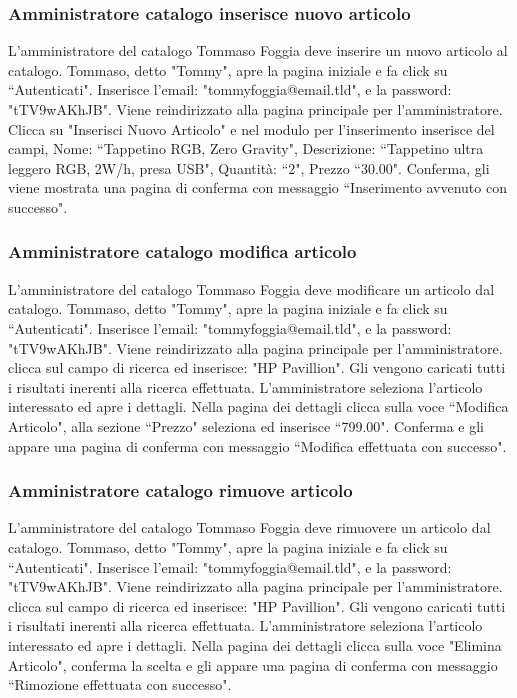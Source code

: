\documentclass[12pt]{article}
\begin{document}
\subsubsection{Amministratore catalogo inserisce nuovo articolo}
L'amministratore del catalogo Tommaso Foggia deve inserire un nuovo articolo al catalogo.
Tommaso, detto "Tommy", apre la pagina iniziale e fa click su ``Autenticati".
Inserisce l'email: "tommyfoggia@email.tld", e la password: "tTV9wAKhJB".
Viene reindirizzato alla pagina principale per l'amministratore.
Clicca su "Inserisci Nuovo Articolo" e nel modulo per l'inserimento inserisce del campi, Nome: ``Tappetino RGB, Zero Gravity", Descrizione: ``Tappetino ultra leggero RGB, 2W/h, presa USB",
Quantità: ``2", Prezzo ``30.00".
Conferma, gli viene mostrata una pagina di conferma con messaggio ``Inserimento avvenuto con successo".

\newpage

\subsubsection{Amministratore catalogo modifica articolo}
L'amministratore del catalogo Tommaso Foggia deve modificare un articolo dal catalogo.
Tommaso, detto "Tommy", apre la pagina iniziale e fa click su ``Autenticati".
Inserisce l'email: "tommyfoggia@email.tld", e la password: "tTV9wAKhJB".
Viene reindirizzato alla pagina principale per l'amministratore.
clicca sul campo di ricerca ed inserisce: "HP Pavillion".
Gli vengono caricati tutti i risultati inerenti alla ricerca effettuata.
L'amministratore seleziona l'articolo interessato ed apre i dettagli.
Nella pagina dei dettagli clicca sulla voce ``Modifica Articolo",
alla sezione ``Prezzo" seleziona ed inserisce ``799.00".
Conferma e gli appare una pagina di conferma con messaggio ``Modifica effettuata con successo".

\subsubsection{Amministratore catalogo rimuove articolo}
L'amministratore del catalogo Tommaso Foggia deve rimuovere un articolo dal catalogo.
Tommaso, detto "Tommy", apre la pagina iniziale e fa click su ``Autenticati".
Inserisce l'email: "tommyfoggia@email.tld", e la password: "tTV9wAKhJB".
Viene reindirizzato alla pagina principale per l'amministratore.
clicca sul campo di ricerca ed inserisce: "HP Pavillion".
Gli vengono caricati tutti i risultati inerenti alla ricerca effettuata.
L'amministratore seleziona l'articolo interessato ed apre i dettagli.
Nella pagina dei dettagli clicca sulla voce "Elimina Articolo",
conferma la scelta e gli appare una pagina di conferma con messaggio ``Rimozione effettuata con successo".
\end{document}
